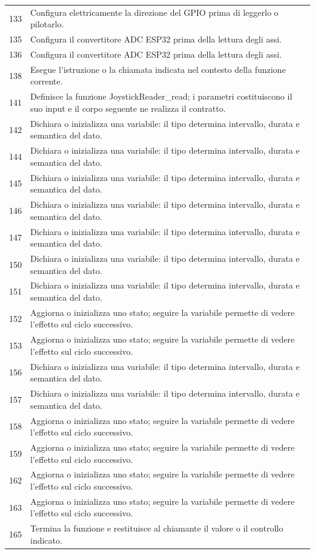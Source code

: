 \documentclass[11pt,a4paper]{article}
\begin{document}
\begin{longtable}{p{}p{}}
133 & Configura elettricamente la direzione del GPIO prima di leggerlo o pilotarlo. \\
135 & Configura il convertitore ADC ESP32 prima della lettura degli assi. \\
136 & Configura il convertitore ADC ESP32 prima della lettura degli assi. \\
138 & Esegue l'istruzione o la chiamata indicata nel contesto della funzione corrente. \\
141 & Definisce la funzione JoystickReader\_\allowbreak{}read; i parametri costituiscono il suo input e il corpo seguente ne realizza il contratto. \\
142 & Dichiara o inizializza una variabile: il tipo determina intervallo, durata e semantica del dato. \\
144 & Dichiara o inizializza una variabile: il tipo determina intervallo, durata e semantica del dato. \\
145 & Dichiara o inizializza una variabile: il tipo determina intervallo, durata e semantica del dato. \\
146 & Dichiara o inizializza una variabile: il tipo determina intervallo, durata e semantica del dato. \\
147 & Dichiara o inizializza una variabile: il tipo determina intervallo, durata e semantica del dato. \\
150 & Dichiara o inizializza una variabile: il tipo determina intervallo, durata e semantica del dato. \\
151 & Dichiara o inizializza una variabile: il tipo determina intervallo, durata e semantica del dato. \\
152 & Aggiorna o inizializza uno stato; seguire la variabile permette di vedere l'effetto sul ciclo successivo. \\
153 & Aggiorna o inizializza uno stato; seguire la variabile permette di vedere l'effetto sul ciclo successivo. \\
156 & Dichiara o inizializza una variabile: il tipo determina intervallo, durata e semantica del dato. \\
157 & Dichiara o inizializza una variabile: il tipo determina intervallo, durata e semantica del dato. \\
158 & Aggiorna o inizializza uno stato; seguire la variabile permette di vedere l'effetto sul ciclo successivo. \\
159 & Aggiorna o inizializza uno stato; seguire la variabile permette di vedere l'effetto sul ciclo successivo. \\
162 & Aggiorna o inizializza uno stato; seguire la variabile permette di vedere l'effetto sul ciclo successivo. \\
163 & Aggiorna o inizializza uno stato; seguire la variabile permette di vedere l'effetto sul ciclo successivo. \\
165 & Termina la funzione e restituisce al chiamante il valore o il controllo indicato. \\
\bottomrule
\end{longtable}
\end{document}
